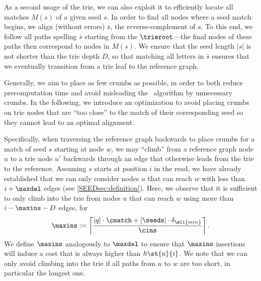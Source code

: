 %
As a second usage of the trie, we can also exploit it to efficiently locate all
matches $M(s)$ of a given seed $s$.
%
In order to find all nodes where a seed match begins, we align (without errors)
$\bar{s}$, the reverse-complement of $s$. To this end, we follow all paths
spelling $\bar{s}$ starting from the $\trieroot$---the final nodes of these
paths then correspond to nodes in $M(s)$. We ensure that the seed length $|s|$
is not shorter than the trie depth $D$, so that matching all letters in
$\bar{s}$ ensures that we eventually transition from a trie leaf to the
reference graph.


 \label{SEEDpar:skip_crumbs}
%
Generally, we aim to place as few crumbs as possible, in order to both reduce
precomputation time and avoid misleading the \A~algorithm by unnecessary crumbs.
In the following, we introduce an optimization to avoid placing crumbs on trie
nodes that are ``too close'' to the match of their corresponding seed so they
cannot lead to an optimal alignment.

Specifically, when traversing the reference graph backwards to place crumbs for
a match of seed $s$ starting at node $w$, we may ``climb'' from a reference
graph node $u$ to a trie node $u'$ backwards through an edge that otherwise
leads from the trie to the reference.
%
Assuming $s$ starts at position $i$ in the read, we have already established
that we can only consider nodes $u$ that can reach $w$ with less than
$i+\maxdel$ edges (see \cref{SEEDsec:definition}).
%
Here, we observe that it is sufficient to only climb into the trie from nodes
$u$ that can reach $w$ using more than~$i-\maxins-D$ edges, for
\begin{align}
	\maxins := \left\lceil \frac{\lvert q \rvert \cdot \cmatch + |\seeds| \cdot \delta_{\mli{min}}}{\cins} \right\rceil.
\end{align}
%
We define $\maxins$ analogously to $\maxdel$ to ensure that $\maxins$ insertions
will induce a cost that is always higher than $h\st{u}{i}$. We note that we can
only avoid climbing into the trie if all paths from $u$ to $w$ are too short, in
particular the longest one.

